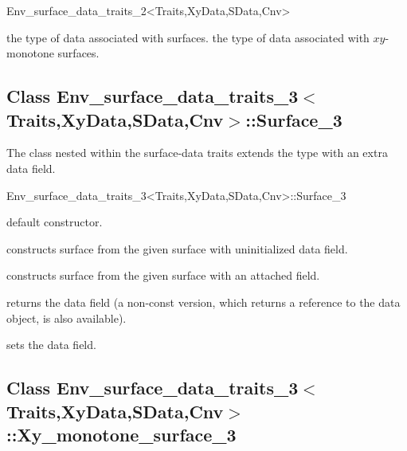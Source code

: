 \begin{ccRefClass}{Env_surface_data_traits_2<Traits,XyData,SData,Cnv>}

    {the type of data associated with surfaces.}
\ccGlue
{}
    {the type of data associated with $xy$-monotone surfaces.}

\ccInheritsFrom

\subsection*{Class Env\_surface\_data\_traits\_3$<$Traits,XyData,SData,Cnv$>$::Surface\_3}

The  class nested within the surface-data traits
extends the  type with an extra data field.

\begin{ccClass}{Env_surface_data_traits_3<Traits,XyData,SData,Cnv>::Surface_3}

\ccInheritsFrom

\ccCreation
{}

    {default constructor.}

    {constructs surface from the given  surface with uninitialized
     data field.}

    {constructs surface from the given  surface with an attached
      field.}

\ccAccessFunctions

  {returns the data field (a non-const version, which returns a reference
   to the data object, is also available).}

  {sets the data field.}

\end{ccClass}

\subsection*{Class Env\_surface\_data\_traits\_3$<$Traits,XyData,SData,Cnv$>$::Xy_monotone_surface\_3}


\end{ccRefClass}
